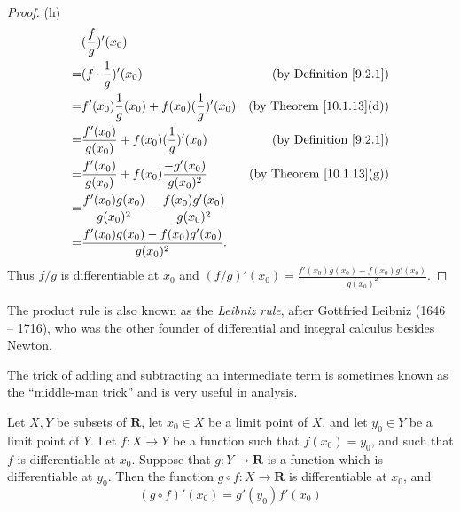 \begin{proof}{(h)}
    \begin{align*}
          & (\frac{f}{g})'(x_0)                                                                                      \\
        = & (f \cdot \frac{1}{g})'(x_0)                                       & \text{(by Definition \ref{9.2.1})}   \\
        = & f'(x_0) \frac{1}{g}(x_0) + f(x_0) (\frac{1}{g})'(x_0)             & \text{(by Theorem \ref{10.1.13}(d))} \\
        = & \frac{f'(x_0)}{g(x_0)} + f(x_0) (\frac{1}{g})'(x_0)               & \text{(by Definition \ref{9.2.1})}   \\
        = & \frac{f'(x_0)}{g(x_0)} + f(x_0) \frac{-g'(x_0)}{g(x_0)^2}         & \text{(by Theorem \ref{10.1.13}(g))} \\
        = & \frac{f'(x_0) g(x_0)}{g(x_0)^2} - \frac{f(x_0) g'(x_0)}{g(x_0)^2}                                        \\
        = & \frac{f'(x_0) g(x_0) - f(x_0) g'(x_0)}{g(x_0)^2}.                                                        \\
    \end{align*}
    Thus \(f / g\) is differentiable at \(x_0\) and \((f / g)'(x_0) = \frac{f'(x_0) g(x_0) - f(x_0) g'(x_0)}{g(x_0)^2}\).
\end{proof}

\begin{remark}\label{10.1.14}
    The product rule is also known as the \emph{Leibniz rule}, after Gottfried Leibniz (1646 -- 1716), who was the other founder of differential and integral calculus besides Newton.
\end{remark}

\begin{note}
    The trick of adding and subtracting an intermediate term is sometimes known as the ``middle-man trick'' and is very useful in analysis.
\end{note}

\begin{theorem}\label{10.1.15}
    Let \(X, Y\) be subsets of \(\mathbf{R}\), let \(x_0 \in X\) be a limit point of \(X\), and let \(y_0 \in Y\) be a limit point of \(Y\).
    Let \(f : X \to Y\) be a function such that \(f(x_0) = y_0\), and such that \(f\) is differentiable at \(x_0\).
    Suppose that \(g : Y \to \mathbf{R}\) is a function which is differentiable at \(y_0\).
    Then the function \(g \circ f : X \to \mathbf{R}\) is differentiable at \(x_0\), and
    \[
        (g \circ f)'(x_0) = g'(y_0) f'(x_0)
    \]
\end{theorem}

